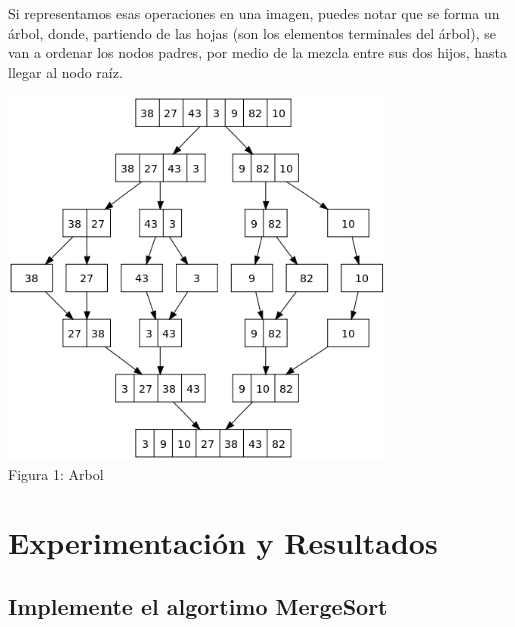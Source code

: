 \documentclass[spanish]{article}
\begin{document}
	\bigskip
	Si representamos esas operaciones en una imagen, puedes notar que se forma un árbol, donde, partiendo de las hojas (son los elementos terminales del árbol), se van a ordenar los nodos padres, por medio de la mezcla entre sus dos hijos, hasta llegar al nodo raíz.\\

	\begin{center}
	\includegraphics[width=100mm]{./imagenes/i1.png}\\
		Figura 1: Arbol 
	\end{center}
	\newpage	

	\bigskip
	\section{Experimentaci\'on y Resultados}
	
	\subsection{Implemente el algortimo MergeSort}
	
\end{document}
